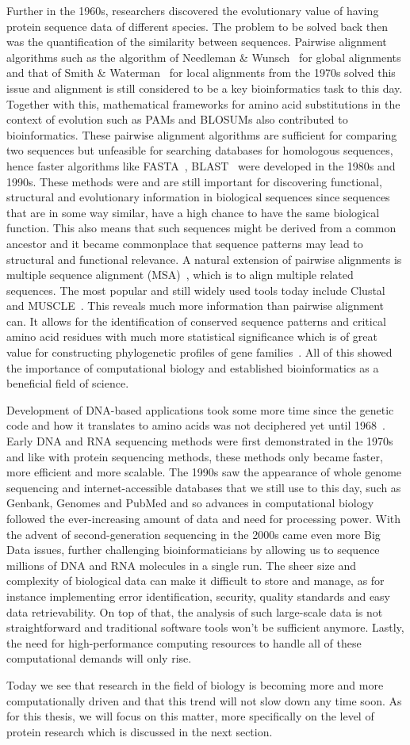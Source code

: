 Further in the 1960s, researchers discovered the evolutionary value of having protein sequence data of different species. The problem to be solved back then was the quantification of the similarity between sequences. Pairwise alignment algorithms such as the algorithm of Needleman \& Wunsch~\cite{global} for global alignments and that of Smith \& Waterman~\cite{local} for local alignments from the 1970s solved this issue and alignment is still considered to be a key bioinformatics task to this day. Together with this, mathematical frameworks for amino acid substitutions in the context of evolution such as PAMs and BLOSUMs also contributed to bioinformatics. These pairwise alignment algorithms are sufficient for comparing two sequences but unfeasible for searching databases for homologous sequences, hence faster algorithms like FASTA~\cite{fasta}, BLAST~\cite{blast} were developed in the 1980s and 1990s. These methods were and are still important for discovering functional, structural and evolutionary information in biological sequences since sequences that are in some way similar, have a high chance to have the same biological function. This also means that such sequences might be derived from a common ancestor and it became commonplace that sequence patterns may lead to structural and functional relevance. A natural extension of pairwise alignments is multiple sequence alignment (MSA)~\cite{msa}, which is to align multiple related sequences. The most popular and still widely used tools today include Clustal~\cite{clustal} and MUSCLE~\cite{muscle}. This reveals much more information than pairwise alignment can. It allows for the identification of conserved sequence patterns and critical amino acid residues with much more statistical significance which is of great value for constructing phylogenetic profiles of gene families~\cite{phylo}. All of this showed the importance of computational biology and established bioinformatics as a beneficial field of science.

Development of DNA-based applications took some more time since the genetic code and how it translates to amino acids was not deciphered yet until 1968~\cite{codon}. Early DNA and RNA sequencing methods were first demonstrated in the 1970s~\cite{dnaseq, rna} and like with protein sequencing methods, these methods only became faster, more efficient and more scalable. The 1990s saw the appearance of whole genome sequencing and internet-accessible databases that we still use to this day, such as Genbank, Genomes and PubMed and so advances in computational biology followed the ever-increasing amount of data and need for processing power. With the advent of second-generation sequencing in the 2000s came even more Big Data issues, further challenging bioinformaticians by allowing us to sequence millions of DNA and RNA molecules in a single run. The sheer size and complexity of biological data can make it difficult to store and manage, as for instance implementing error identification, security, quality standards and easy data retrievability. On top of that, the analysis of such large-scale data is not straightforward and traditional software tools won't be sufficient anymore. Lastly, the need for high-performance computing resources to handle all of these computational demands will only rise.

Today we see that research in the field of biology is becoming more and more computationally driven and that this trend will not slow down any time soon. As for this thesis, we will focus on this matter, more specifically on the level of protein research which is discussed in the next section.